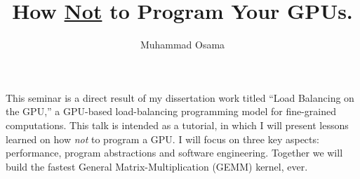 \documentclass[12pt]{amsart}
\title{How \underline{Not} to Program Your GPUs.}
\author{Muhammad Osama}
\begin{document}
\maketitle	
\thispagestyle{empty}

This seminar is a direct result of my dissertation work titled ``Load Balancing on the GPU,'' a GPU-based load-balancing programming model for fine-grained computations. This talk is intended as a tutorial, in which I will present lessons learned on how \emph{not} to program a GPU. I will focus on three key aspects: performance, program abstractions and software engineering. Together we will build the fastest General Matrix-Multiplication (GEMM) kernel, ever.

\end{document}
